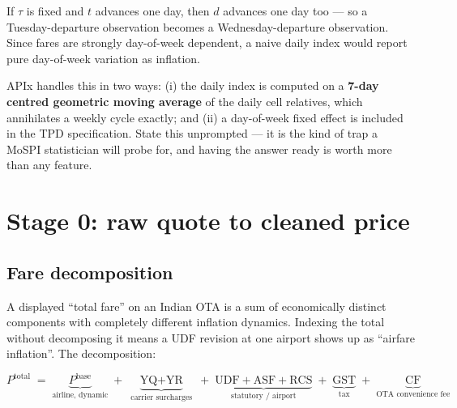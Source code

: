 \begin{warnbox}
 If $\tau$ is fixed and $t$
advances one day, then $d$ advances one day too --- so a Tuesday-departure observation
becomes a Wednesday-departure observation. Since fares are strongly day-of-week dependent,
a naive daily index would report pure day-of-week variation as inflation.

APIx handles this in two ways: (i) the daily index is computed on a \textbf{7-day centred
geometric moving average} of the daily cell relatives, which annihilates a weekly cycle
exactly; and (ii) a day-of-week fixed effect is included in the TPD specification. State
this unprompted --- it is the kind of trap a MoSPI statistician will probe for, and having
the answer ready is worth more than any feature.
\end{warnbox}

\section{Stage 0: raw quote to cleaned price}

\subsection{Fare decomposition}

A displayed ``total fare'' on an Indian OTA is a sum of economically distinct components
with completely different inflation dynamics. Indexing the total without decomposing it
means a UDF revision at one airport shows up as ``airfare inflation''. The decomposition:

\begin{equation}
P^{\text{total}} \;=\; \underbrace{P^{\text{base}}}_{\text{airline, dynamic}}
\;+\; \underbrace{\text{YQ} + \text{YR}}_{\text{carrier surcharges}}
\;+\; \underbrace{\text{UDF} + \text{ASF} + \text{RCS}}_{\text{statutory / airport}}
\;+\; \underbrace{\text{GST}}_{\text{tax}}
\;+\; \underbrace{\text{CF}}_{\text{OTA convenience fee}}
\end{equation}

